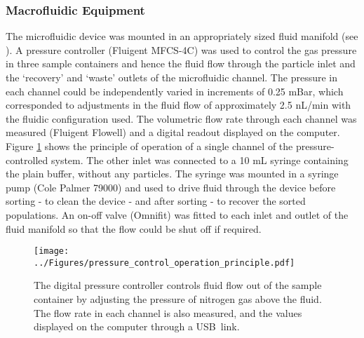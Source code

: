 \subsubsection{Macrofluidic Equipment}
The microfluidic device was mounted in an appropriately sized fluid manifold (see ). A pressure controller (Fluigent MFCS-4C) was used to control the gas pressure in three sample containers and hence the fluid flow through the particle inlet and the `recovery' and `waste' outlets of the microfluidic channel. The pressure in each channel could be independently varied in increments of 0.25 mBar, which corresponded to adjustments in the fluid flow of approximately 2.5 nL/min with the fluidic configuration used. The volumetric flow rate through each channel was measured (Fluigent Flowell) and a digital readout displayed on the computer. Figure \ref{fig:pressure_control_operation_principle} shows the principle of operation of a single channel of the pressure-controlled system. The other inlet was connected to a 10 mL syringe containing the plain buffer, without any particles. The syringe was mounted in a syringe pump (Cole Palmer 79000) and used to drive fluid through the device before sorting - to clean the device - and after sorting - to recover the sorted populations. An on-off valve (Omnifit) was fitted to each inlet and outlet of the fluid manifold so that the flow could be shut off if required.

\begin{figure}[tbp]
 \centering
 \texttt{[image: ../Figures/pressure\_control\_operation\_principle.pdf]}
 \caption[Schematic of the pressure control system.]{The digital pressure controller controls fluid flow out of the sample container by adjusting the pressure of nitrogen gas above the fluid. The flow rate in each channel is also measured, and the values displayed on the computer through a USB~link.}
 \label{fig:pressure_control_operation_principle}
\end{figure}


